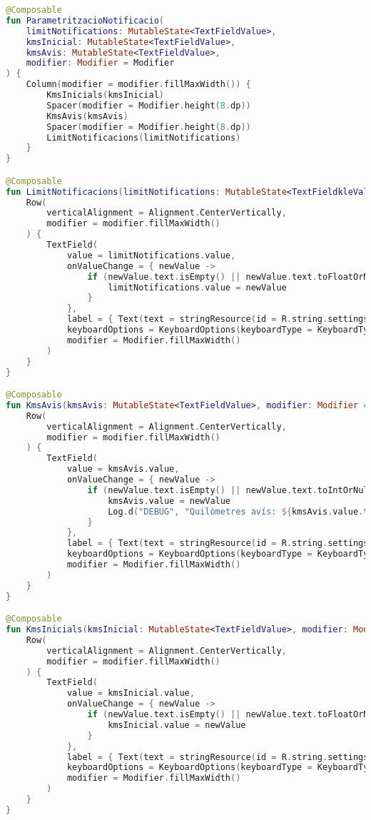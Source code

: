 \documentclass[a4paper,12pt]{article}
\begin{document}
\begin{lstlisting}[language=Kotlin]
@Composable
fun ParametritzacioNotificacio(
    limitNotifications: MutableState<TextFieldValue>,
    kmsInicial: MutableState<TextFieldValue>,
    kmsAvis: MutableState<TextFieldValue>,
    modifier: Modifier = Modifier
) {
    Column(modifier = modifier.fillMaxWidth()) {
        KmsInicials(kmsInicial)
        Spacer(modifier = Modifier.height(8.dp))
        KmsAvis(kmsAvis)
        Spacer(modifier = Modifier.height(8.dp))
        LimitNotificacions(limitNotifications)
    }
}

@Composable
fun LimitNotificacions(limitNotifications: MutableState<TextFieldkleValue>, modifier: Modifier = Modifier) {
    Row(
        verticalAlignment = Alignment.CenterVertically,
        modifier = modifier.fillMaxWidth()
    ) {
        TextField(
            value = limitNotifications.value,
            onValueChange = { newValue ->
                if (newValue.text.isEmpty() || newValue.text.toFloatOrNull() != null) {
                    limitNotifications.value = newValue
                }
            },
            label = { Text(text = stringResource(id = R.string.settings_limit_notificacions)) },
            keyboardOptions = KeyboardOptions(keyboardType = KeyboardType.Number),
            modifier = Modifier.fillMaxWidth()
        )
    }
}

@Composable
fun KmsAvis(kmsAvis: MutableState<TextFieldValue>, modifier: Modifier = Modifier) {
    Row(
        verticalAlignment = Alignment.CenterVertically,
        modifier = modifier.fillMaxWidth()
    ) {
        TextField(
            value = kmsAvis.value,
            onValueChange = { newValue ->
                if (newValue.text.isEmpty() || newValue.text.toIntOrNull() != null) {
                    kmsAvis.value = newValue
                    Log.d("DEBUG", "Quilòmetres avís: ${kmsAvis.value.text}")
                }
            },
            label = { Text(text = stringResource(id = R.string.settings_km_avis)) },
            keyboardOptions = KeyboardOptions(keyboardType = KeyboardType.Number),
            modifier = Modifier.fillMaxWidth()
        )
    }
}

@Composable
fun KmsInicials(kmsInicial: MutableState<TextFieldValue>, modifier: Modifier = Modifier) {
    Row(
        verticalAlignment = Alignment.CenterVertically,
        modifier = modifier.fillMaxWidth()
    ) {
        TextField(
            value = kmsInicial.value,
            onValueChange = { newValue ->
                if (newValue.text.isEmpty() || newValue.text.toFloatOrNull() != null) {
                    kmsInicial.value = newValue
                }
            },
            label = { Text(text = stringResource(id = R.string.settings_km_start)) },
            keyboardOptions = KeyboardOptions(keyboardType = KeyboardType.Number),
            modifier = Modifier.fillMaxWidth()
        )
    }
}


\end{lstlisting}
\end{document}
